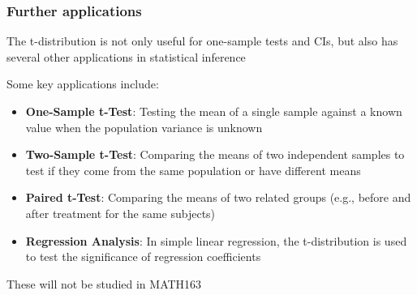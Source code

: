 \documentclass[t,8pt]{beamer}%
\begin{document}
\begin{frame}
	\frametitle{Further applications}
    The t-distribution is not only useful for one-sample tests and CIs, but also has several other applications in statistical inference \par
    Some key applications include:
    \begin{itemize}
        \item \textbf{One-Sample t-Test}: Testing the mean of a single sample against a known value when the population variance is unknown
        \item \textbf{Two-Sample t-Test}: Comparing the means of two independent samples to test if they come from the same population or have different means
        \item \textbf{Paired t-Test}: Comparing the means of two related groups (e.g., before and after treatment for the same subjects)
        \item \textbf{Regression Analysis}: In simple linear regression, the t-distribution is used to test the significance of regression coefficients
    \end{itemize}
    These will not be studied in MATH163
\end{frame}
\end{document}

